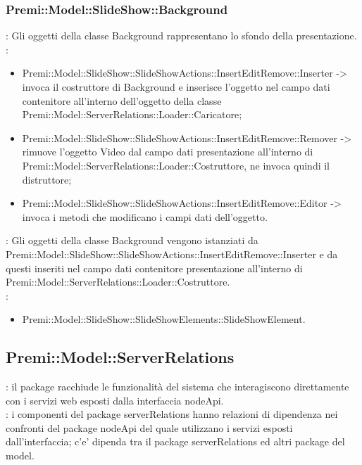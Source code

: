 {                 \subsubsection{Premi::Model::SlideShow::Background}{
                				\textbf{\tipo}: Gli oggetti della classe Background rappresentano lo sfondo della presentazione.\\
                				\textbf{\relaz}: 
                				\begin{itemize}
                					\item Premi::Model::SlideShow::SlideShowActions::InsertEditRemove::Inserter -> invoca il costruttore di Background e inserisce l’oggetto nel campo dati contenitore all’interno dell’oggetto della classe Premi::Model::ServerRelations::Loader::Caricatore;
                                    \item Premi::Model::SlideShow::SlideShowActions::InsertEditRemove::Remover -> rimuove l’oggetto Video dal campo dati presentazione all’interno di Premi::Model::ServerRelations::Loader::Costruttore, ne invoca quindi il distruttore;
                                    \item Premi::Model::SlideShow::SlideShowActions::InsertEditRemove::Editor -> invoca i metodi che modificano i campi dati dell'oggetto.
                				\end{itemize}	
                                \textbf{\interfacce}: Gli oggetti della classe Background vengono istanziati da Premi::Model::SlideShow::SlideShowActions::InsertEditRemove::Inserter e da questi inseriti nel campo dati contenitore presentazione all’interno di Premi::Model::ServerRelations::Loader::Costruttore.\\
                                \textbf{\base}: 
                                    \begin{itemize}
                                    \item Premi::Model::SlideShow::SlideShowElements::SlideShowElement.
                                    \end{itemize}
                                    }              
}


\subsection{Premi::Model::ServerRelations}{
		\textbf{\tipo}: il package racchiude le funzionalità del sistema che interagiscono direttamente con i servizi web esposti dalla interfaccia nodeApi.\\
		\textbf{\relaz}: i componenti del package serverRelations hanno relazioni di dipendenza nei confronti del package nodeApi del quale utilizzano i servizi esposti dall’interfaccia; c’e’ dipenda tra il package serverRelations ed altri package del model.\\
}

